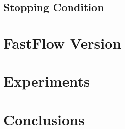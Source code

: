 \documentclass[12pt]{article}
\begin{document}
\subsection{Stopping Condition}


\section{FastFlow Version}

\section{Experiments}

\section{Conclusions}

  

\end{document}
